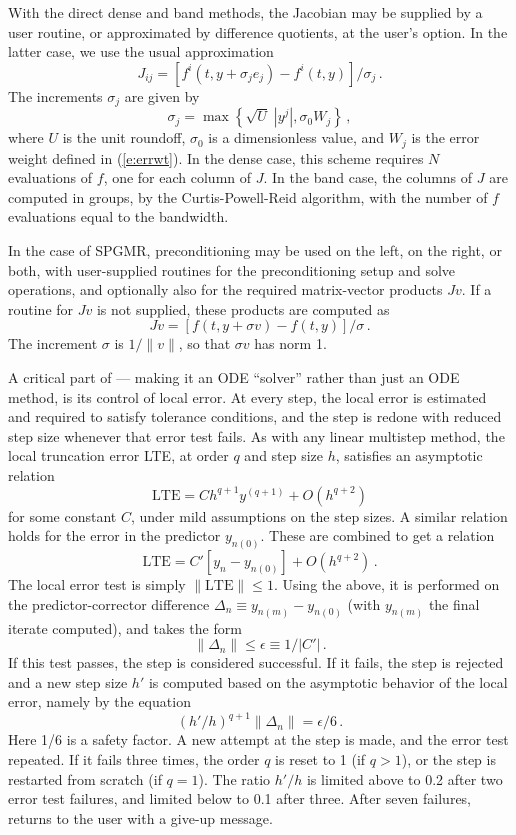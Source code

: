 With the direct dense and band methods, the Jacobian may be supplied
by a user routine, or approximated by difference quotients,
at the user's option.  In the latter case, we use the usual
approximation
\[ J_{ij} = [f^i(t,y+\sigma_j e_j) - f^i(t,y)]/\sigma_j \, . \]
The increments $\sigma_j$ are given by
\[ \sigma_j = \max\left\{\sqrt{U} \; |y^j| , \sigma_0 W_j \right\} \, , \]
where $U$ is the unit roundoff, $\sigma_0$ is a dimensionless value,
and $W_j$ is the error weight defined in (\ref{e:errwt}).  In the dense
case, this scheme requires $N$ evaluations of $f$, one for each column
of $J$.  In the band case, the columns of $J$ are computed in groups,
by the Curtis-Powell-Reid algorithm, with the number of $f$ evaluations
equal to the bandwidth.

In the case of SPGMR, preconditioning may be used on the left, on the
right, or both, with user-supplied routines for the preconditioning
setup and solve operations, and optionally also for the required
matrix-vector products $Jv$.  If a routine for $Jv$ is not supplied,
these products are computed as
\begin{equation}\label{jacobv}
Jv = [f(t,y+\sigma v) - f(t,y)]/\sigma \, . 
\end{equation}
The increment $\sigma$ is $1/\|v\|$, so that $\sigma v$ has norm 1.

A critical part of {\cvode} --- making it an ODE ``solver'' rather than
just an ODE method, is its control of local error.  At every step, the
local error is estimated and required to satisfy tolerance conditions,
and the step is redone with reduced step size whenever that error test
fails.  As with any linear multistep method, the local truncation
error LTE, at order $q$ and step size $h$, satisfies an asymptotic
relation
\[ \mbox{LTE} = C h^{q+1} y^{(q+1)} + O(h^{q+2}) \]
for some constant $C$, under mild assumptions on the step sizes.
A similar relation holds for the error in the predictor $y_{n(0)}$.
These are combined to get a relation
\[ \mbox{LTE} = C' [y_n - y_{n(0)}] + O(h^{q+2}) \, . \]
The local error test is simply $\|\mbox{LTE}\| \leq 1$.  Using the above,
it is performed on the predictor-corrector difference 
$\Delta_n \equiv y_{n(m)} - y_{n(0)}$ (with $y_{n(m)}$ the final
iterate computed), and takes the form
\[ \|\Delta_n\| \leq \epsilon \equiv 1/|C'| \, . \]
If this test passes, the step is considered successful.  If it fails,
the step is rejected and a new step size $h'$ is computed based on the
asymptotic behavior of the local error, namely by the equation
\[ (h'/h)^{q+1} \|\Delta_n\| = \epsilon/6 \, . \]
Here 1/6 is a safety factor.  A new attempt at the step is made,
and the error test repeated.  If it fails three times, the order $q$
is reset to 1 (if $q > 1$), or the step is restarted from scratch (if
$q = 1$).  The ratio $h'/h$ is limited above to 0.2 after two error test
failures, and limited below to 0.1 after three.  After seven failures,
{\cvode} returns to the user with a give-up message.

